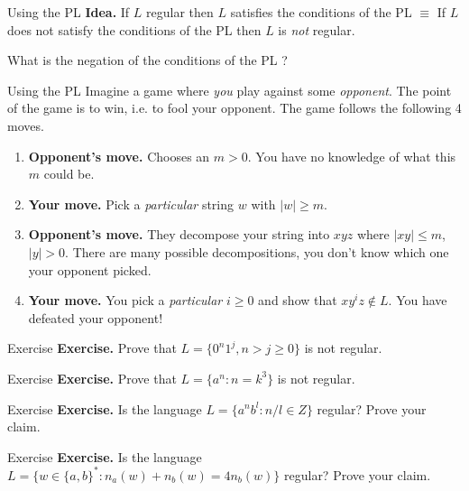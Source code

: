 \documentclass[10pt]{beamer}
\begin{document}
\begin{frame}{Using the PL}
    \textbf{Idea.} If $L$ regular then $L$ satisfies the conditions of the PL $\equiv$ If $L$ does not satisfy the conditions of the PL then $L$ is \textit{not} regular.

    What is the negation of the conditions of the PL ?
\end{frame}

\begin{frame}{Using the PL}
    Imagine a game where \textit{you} play against some \textit{opponent}. The point of the game is to win, i.e. to fool your opponent. The game follows the following 4 moves.

    \begin{enumerate}[Move 1.]
        \item \textbf{Opponent's move.} Chooses an $m > 0$. You have no knowledge of what this $m$ could be.
        \item \textbf{Your move.} Pick a \textit{particular} string $w$ with $|w| \geq m$.
        \item \textbf{Opponent's move.} They decompose your string into $xyz$ where $|xy| \leq m$, $|y| > 0$. There are many possible decompositions, you don't know which one your opponent picked.
        \item \textbf{Your move.} You pick a \textit{particular} $i \geq 0$ and show that $xy^iz \notin L$. You have defeated your opponent!
    \end{enumerate}
\end{frame}

\begin{frame}[t]{Exercise}
    \textbf{Exercise.} Prove that $L=\{{0^n}1^j, n>j \geq 0\}$ is not regular.
\end{frame}

\begin{frame}[t]{Exercise}
    \textbf{Exercise.} Prove that $L = \{a^n : n = k^3\}$ is not regular.
\end{frame}

\begin{frame}[t]{Exercise}
    \textbf{Exercise.} Is the language $L=\{a^nb^l:n/l\in Z\}$ regular? Prove your claim.
\end{frame}

\begin{frame}[t]{Exercise}
    \textbf{Exercise.} Is the language $L=\{w \in \{a,b\}^* : n_a(w) + n_b(w) = 4n_b(w) \}$ regular? Prove your claim.
\end{frame}
\end{document}
